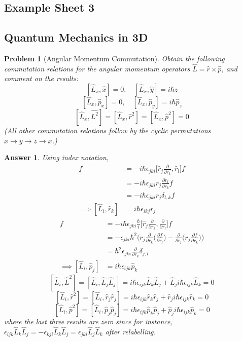 \documentclass[a4paper]{article}
\newtheorem{ans}{Answer}[section]
\theoremstyle{new}
\newtheorem{qns}{Problem}[section]
\begin{document}
\subsection{Example Sheet 3}
\subsection*{Quantum Mechanics in 3D}
\begin{qns}[Angular Momentum Commutation]
Obtain the following commutation relations for the angular momentum operators $\hat{L}=\hat{r}\times\hat{p}$, and comment on the results:
$$[\hat{L}_x,\hat{x}]=0,\quad [\hat{L}_x,\hat{y}]=i\hbar\hat{z}$$
$$[\hat{L}_x,\hat{p}_x]=0,\quad[\hat{L}_x,\hat{p}_y]=i\hbar\hat{p}_z$$
$$[\hat{L}_x,\hat{L^2}]=[\hat{L}_x,\hat{r}^2]=[\hat{L}_x,\hat{p}^2]=0$$
(All other commutation relations follow by the cyclic permutations $x\rightarrow y\rightarrow z\rightarrow x$.)
\end{qns}
\begin{ans}
Using index notation,
\begin{align}
[\hat{L}_i,\hat{r}_l]f&=-i\hbar\epsilon_{jki}\bigg[\hat{r}_j\frac{\partial}{\partial r_k},\hat{r}_l\bigg]f\nonumber\\&=-i\hbar\epsilon_{jki}r_j\frac{\partial r_l}{\partial r_k}f\nonumber\\&=-i\hbar\epsilon_{jki}r_j\delta_{l,k}f\nonumber\\\implies[\hat{L}_i,\hat{r}_k]&=i\hbar\epsilon_{ikj}r_j\nonumber
\end{align}
\begin{align}
[\hat{L}_i,\hat{p}_l]f&=-i\hbar\epsilon_{jki}\frac{\hbar}{i}\bigg[\hat{r}_j\frac{\partial}{\partial r_k},\frac{\partial}{\partial r_l}\bigg]f\nonumber\\&=-\epsilon_{jki}\hbar^2\bigg(r_j\frac{\partial}{\partial r_k}\bigg(\frac{\partial f}{\partial r_l}\bigg)-\frac{\partial}{\partial r_l}\bigg(r_j\frac{\partial f}{\partial r_k}\bigg)\bigg)\nonumber\\&=\hbar^2\epsilon_{jki}\frac{\partial }{\partial r_k}\delta_{j,l}\nonumber\\\implies[\hat{L}_i,\hat{p}_j]&=i\hbar\epsilon_{ijk}\hat{p}_k\nonumber
\end{align}
$$[\hat{L}_i,\hat{L}^2]=[\hat{L}_i,\hat{L}_j\hat{L}_j]=i\hbar\epsilon_{ijk}\hat{L}_k\hat{L}_j+\hat{L}_ji\hbar\epsilon_{ijk}\hat{L}_k=0$$
$$[\hat{L}_i,\hat{r}^2]=[\hat{L}_i,\hat{r}_j\hat{r}_j]=i\hbar\epsilon_{ijk}\hat{r}_k\hat{r}_j+\hat{r}_ji\hbar\epsilon_{ijk}\hat{r}_k=0$$
$$[\hat{L}_i,\hat{p}^2]=[\hat{L}_i,\hat{p}_j\hat{p}_j]=i\hbar\epsilon_{ijk}\hat{p}_k\hat{p}_j+\hat{p}_ji\hbar\epsilon_{ijk}\hat{p}_k=0$$
where the last three results are zero since for instance,  $\epsilon_{ijk}\hat{L}_k\hat{L}_j=-\epsilon_{kji}\hat{L}_k\hat{L}_j=\epsilon_{jki}\hat{L}_j\hat{L}_k$ after relabelling.
\end{ans}
\end{document}
